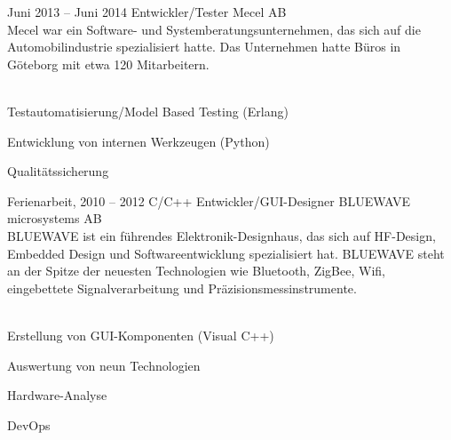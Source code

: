 \documentclass[fontsize=10pt]{tccv}
\begin{document}
\begin{eventlist}
\newpage

\item{Juni 2013 -- Juni 2014}
     {Entwickler/Tester}
     {Mecel AB}
\\
Mecel war ein Software- und Systemberatungsunternehmen, das sich auf die
Automobilindustrie spezialisiert hatte. Das Unternehmen hatte Büros in
Göteborg mit etwa 120 Mitarbeitern.
\\\\
\begin{assignments}
\item{Testautomatisierung/Model Based Testing (Erlang)}
\item{Entwicklung von internen Werkzeugen (Python)}
\item{Qualitätssicherung}
\end{assignments}

\item{Ferienarbeit, 2010 -- 2012}
     {C/C++ Entwickler/GUI-Designer}
     {BLUEWAVE microsystems AB}
\\
BLUEWAVE ist ein führendes Elektronik-Designhaus, das sich auf HF-Design,
Embedded Design und Softwareentwicklung spezialisiert hat. BLUEWAVE steht an
der Spitze der neuesten Technologien wie Bluetooth, ZigBee, Wifi, eingebettete
Signalverarbeitung und Präzisionsmessinstrumente.
\\\\
\begin{assignments}
\item{Erstellung von GUI-Komponenten (Visual C++)}
\item{Auswertung von neun Technologien }
\item{Hardware-Analyse}
\item{DevOps}
\end{assignments}

\end{eventlist}
\end{document}
